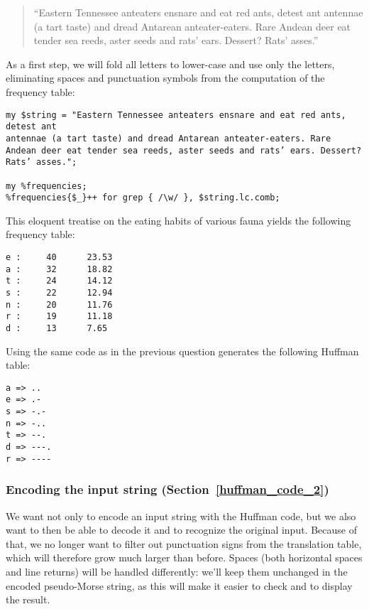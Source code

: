 {\begin{quote}
``Eastern Tennessee anteaters ensnare and eat red ants, detest ant
antennae (a tart taste) and dread Antarean anteater-eaters. Rare
Andean deer eat tender sea reeds, aster seeds and rats’ ears. Dessert?
Rats’ asses.''
\end{quote}

As a first step, we will fold all letters to lower-case and use 
only the letters, eliminating spaces and punctuation symbols from 
the computation of the frequency table:

\begin{verbatim}
my $string = "Eastern Tennessee anteaters ensnare and eat red ants, detest ant
antennae (a tart taste) and dread Antarean anteater-eaters. Rare
Andean deer eat tender sea reeds, aster seeds and rats’ ears. Dessert?
Rats’ asses."; 

my %frequencies;
%frequencies{$_}++ for grep { /\w/ }, $string.lc.comb;
\end{verbatim}

This eloquent treatise on the eating habits of various fauna 
yields the following frequency table:

\begin{verbatim}
e :     40      23.53
a :     32      18.82
t :     24      14.12
s :     22      12.94
n :     20      11.76
r :     19      11.18
d :     13      7.65
\end{verbatim}

Using the same code as in the previous question generates the 
following Huffman table:

\begin{verbatim}
a => ..
e => .-
s => -.-
n => -..
t => --.
d => ---.
r => ----
\end{verbatim}

\subsubsection{Encoding the input string (Section~\ref{huffman_code_2})}

We want not only to encode an input string with the Huffman code, but 
we also want to then be able to decode it and to recognize the original 
input. Because of that, we no longer want to filter out punctuation signs 
from the translation table, which will therefore grow much larger than 
before. Spaces (both horizontal spaces and line returns) will be handled 
differently: we'll keep them unchanged in the encoded pseudo-Morse 
string, as this will make it easier to check and to display the result.

}
